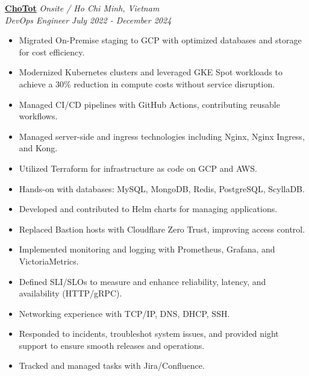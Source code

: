 \documentclass[11pt, a4paper]{article}
\begin{document}
\vspace{0.5em}
\textbf{\href{https://www.chotot.com/}{ChoTot}} \hfill {\small\textit{Onsite / Ho Chi Minh, Vietnam}} \\
\textit{DevOps Engineer} \hfill {\small\textit{July 2022 - December 2024}}
\begin{itemize}[leftmargin=*]
    \item Migrated On-Premise staging to GCP with optimized databases and storage for cost efficiency.
    \item Modernized Kubernetes clusters and leveraged GKE Spot workloads to achieve a 30\% reduction in compute costs without service disruption.
    \item Managed CI/CD pipelines with GitHub Actions, contributing reusable workflows.
    \item Managed server-side and ingress technologies including Nginx, Nginx Ingress, and Kong.
    \item Utilized Terraform for infrastructure as code on GCP and AWS.
    \item Hands-on with databases: MySQL, MongoDB, Redis, PostgreSQL, ScyllaDB.
    \item Developed and contributed to Helm charts for managing applications.
    \item Replaced Bastion hosts with Cloudflare Zero Trust, improving access control.
    \item Implemented monitoring and logging with Prometheus, Grafana, and VictoriaMetrics.
    \item Defined SLI/SLOs to measure and enhance reli\-abil\-ity, la\-ten\-cy, and avail\-abil\-ity (HTTP/\-gRPC).
    \item Networking experience with TCP/IP, DNS, DHCP, SSH.
    \item Responded to incidents, troubleshot system issues, and provided night support to ensure smooth releases and operations.
    \item Tracked and managed tasks with Jira/Confluence.
\end{itemize}
\end{document}
